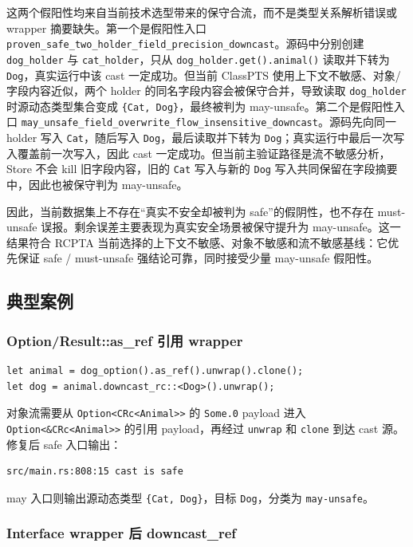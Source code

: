 \documentclass[10.5pt,compsoc,UTF8]{cjc}
\theoremstyle{mystyle}
\begin{document}
这两个假阳性均来自当前技术选型带来的保守合流，而不是类型关系解析错误或 wrapper 摘要缺失。第一个是假阳性入口 \texttt{proven\_safe\_two\_holder\_field\_precision\_downcast}。源码中分别创建 \texttt{dog\_holder} 与 \texttt{cat\_holder}，只从 \texttt{dog\_holder.get().animal()} 读取并下转为 \texttt{Dog}，真实运行中该 cast 一定成功。但当前 ClassPTS 使用上下文不敏感、对象/字段内容近似，两个 holder 的同名字段内容会被保守合并，导致读取 \texttt{dog\_holder} 时源动态类型集合变成 \texttt{\{Cat, Dog\}}，最终被判为 may-unsafe。第二个是假阳性入口 \texttt{may\_unsafe\_field\_overwrite\_flow\_insensitive\_downcast}。源码先向同一 holder 写入 \texttt{Cat}，随后写入 \texttt{Dog}，最后读取并下转为 \texttt{Dog}；真实运行中最后一次写入覆盖前一次写入，因此 cast 一定成功。但当前主验证路径是流不敏感分析，Store 不会 kill 旧字段内容，旧的 \texttt{Cat} 写入与新的 \texttt{Dog} 写入共同保留在字段摘要中，因此也被保守判为 may-unsafe。

因此，当前数据集上不存在“真实不安全却被判为 safe”的假阴性，也不存在 must-unsafe 误报。剩余误差主要表现为真实安全场景被保守提升为 may-unsafe。这一结果符合 RCPTA 当前选择的上下文不敏感、对象不敏感和流不敏感基线：它优先保证 safe / must-unsafe 强结论可靠，同时接受少量 may-unsafe 假阳性。

\subsection{典型案例}

\subsubsection{Option/Result::as\_ref 引用 wrapper}

\begin{lstlisting}
let animal = dog_option().as_ref().unwrap().clone();
let dog = animal.downcast_rc::<Dog>().unwrap();
\end{lstlisting}

对象流需要从 \texttt{Option<CRc<Animal>>} 的 \texttt{Some.0} payload 进入 \texttt{Option<\&CRc<Animal>>} 的引用 payload，再经过 \texttt{unwrap} 和 \texttt{clone} 到达 cast 源。修复后 safe 入口输出：

\begin{lstlisting}
src/main.rs:808:15 cast is safe
\end{lstlisting}

may 入口则输出源动态类型 \texttt{\{Cat, Dog\}}，目标 \texttt{Dog}，分类为 \texttt{may-unsafe}。

\subsubsection{Interface wrapper 后 downcast\_ref}
\end{document}
